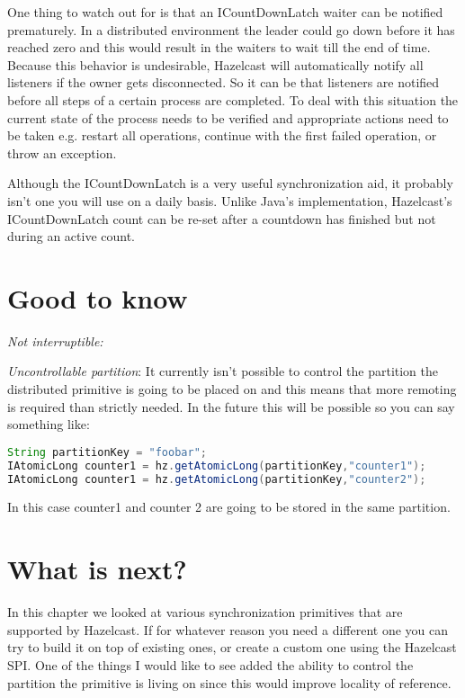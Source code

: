 One thing to watch out for is that an ICountDownLatch waiter can be notified prematurely. In a distributed environment the leader could go down before it has reached zero and this would result in the waiters to wait till the end of time. Because this behavior is undesirable, Hazelcast will automatically notify all listeners if the owner gets disconnected. So it can be that listeners are notified before all steps of a certain process are completed. To deal with this situation the current state of the process needs to be verified and appropriate actions need to be taken e.g. restart all operations, continue with the first failed operation, or throw an exception.

Although the ICountDownLatch is a very useful synchronization aid, it probably isn't one you will use on a daily basis. Unlike Java's implementation, Hazelcast's ICountDownLatch count can be re-set after a countdown has finished but not during an active count. 

\section{Good to know}

\emph{Not interruptible:}

\emph{Uncontrollable partition}: It currently isn't possible to control the partition the distributed primitive is going to be placed on and this means that more remoting is required than strictly needed. In the future this will be possible so you can say something like:
\begin{lstlisting}[language=java]
String partitionKey = "foobar";
IAtomicLong counter1 = hz.getAtomicLong(partitionKey,"counter1");
IAtomicLong counter1 = hz.getAtomicLong(partitionKey,"counter2");
\end{lstlisting}
In this case counter1 and counter 2 are going to be stored in the same partition.

\section{What is next?}
In this chapter we looked at various synchronization primitives that are supported by Hazelcast. If for whatever reason you need a different one you can try to build it on top of existing ones, or create a custom one using the Hazelcast SPI. One of the things I would like to see added the ability to control the partition the primitive is living on since this would improve locality of reference. 
